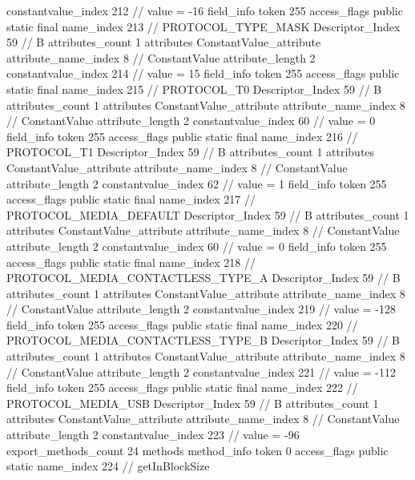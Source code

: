 {{{{{{{					constantvalue_index	212		// value = -16
				}
				}
			}
			field_info {
				token	255
				access_flags	public static final
				name_index	213		// PROTOCOL_TYPE_MASK
				Descriptor_Index	59		// B
				attributes_count	1
				attributes {
				ConstantValue_attribute {
					attribute_name_index	8		// ConstantValue
					attribute_length	2
					constantvalue_index	214		// value = 15
				}
				}
			}
			field_info {
				token	255
				access_flags	public static final
				name_index	215		// PROTOCOL_T0
				Descriptor_Index	59		// B
				attributes_count	1
				attributes {
				ConstantValue_attribute {
					attribute_name_index	8		// ConstantValue
					attribute_length	2
					constantvalue_index	60		// value = 0
				}
				}
			}
			field_info {
				token	255
				access_flags	public static final
				name_index	216		// PROTOCOL_T1
				Descriptor_Index	59		// B
				attributes_count	1
				attributes {
				ConstantValue_attribute {
					attribute_name_index	8		// ConstantValue
					attribute_length	2
					constantvalue_index	62		// value = 1
				}
				}
			}
			field_info {
				token	255
				access_flags	public static final
				name_index	217		// PROTOCOL_MEDIA_DEFAULT
				Descriptor_Index	59		// B
				attributes_count	1
				attributes {
				ConstantValue_attribute {
					attribute_name_index	8		// ConstantValue
					attribute_length	2
					constantvalue_index	60		// value = 0
				}
				}
			}
			field_info {
				token	255
				access_flags	public static final
				name_index	218		// PROTOCOL_MEDIA_CONTACTLESS_TYPE_A
				Descriptor_Index	59		// B
				attributes_count	1
				attributes {
				ConstantValue_attribute {
					attribute_name_index	8		// ConstantValue
					attribute_length	2
					constantvalue_index	219		// value = -128
				}
				}
			}
			field_info {
				token	255
				access_flags	public static final
				name_index	220		// PROTOCOL_MEDIA_CONTACTLESS_TYPE_B
				Descriptor_Index	59		// B
				attributes_count	1
				attributes {
				ConstantValue_attribute {
					attribute_name_index	8		// ConstantValue
					attribute_length	2
					constantvalue_index	221		// value = -112
				}
				}
			}
			field_info {
				token	255
				access_flags	public static final
				name_index	222		// PROTOCOL_MEDIA_USB
				Descriptor_Index	59		// B
				attributes_count	1
				attributes {
				ConstantValue_attribute {
					attribute_name_index	8		// ConstantValue
					attribute_length	2
					constantvalue_index	223		// value = -96
				}
				}
			}
			}
			export_methods_count	24
			methods {
				method_info {
					token	0
					access_flags	public static
					name_index	224		// getInBlockSize
}}}}}
